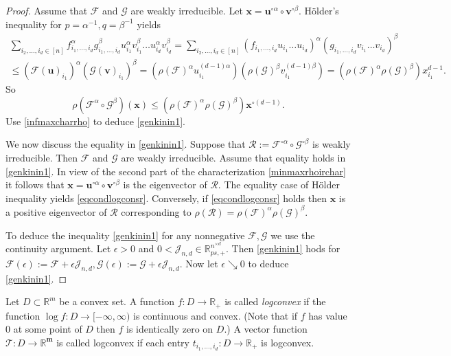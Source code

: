 \documentclass{amsart}
\newcommand{\R}{\mathbb{R}}
\newcommand{\m}{\mathbf{m}}
\newcommand{\uu}{\mathbf{u}}
\newcommand{\bv}{\mathbf{v}}
\newcommand{\x}{\mathbf{x}}
\newcommand{\0}{\mathbf{0}}
\newcommand{\1}{\mathbf{1}}
\newcommand{\cF}{\mathcal{F}}
\newcommand{\cG}{\mathcal{G}}
\newcommand{\cJ}{\mathcal{J}}
\newcommand{\cR}{\mathcal{R}}
\newcommand{\cT}{\mathcal{T}}
\theoremstyle{remark}
\numberwithin{equation}{section} %
\renewcommand{\le}{\leqslant}
\begin{document}
 \begin{proof}
 Assume that  $\cF$ and $\cG$ are weakly irreducible.   Let $\x=\uu^{\circ \alpha}\circ\bv^{\circ\beta}$.
 H\"older's inequality for $p=\alpha^{-1}, q=\beta^{-1}$ yields
 \begin{eqnarray*}
 \sum_{i_2,\ldots,i_d\in[n]} f_{i_1,\ldots,i_d}^{\alpha}g_{i_1,\ldots,i_d}^{\beta}u_{i_1}^{\alpha}v_{i_1}^{\beta}\ldots u_{i_d}^{\alpha}v_{i_d}^{\beta}=
 \sum_{i_2,\ldots,i_d\in[n]} (f_{i_1,\ldots,i_d}u_{i_1}\ldots u_{i_d})^{\alpha}(g_{i_1,\ldots,i_d}v_{i_1}\ldots v_{i_d})^{\beta}\\
 \le (\cF(\uu)_{i_1})^{\alpha}(\cG(\bv)_{i_1})^{\beta}=(\rho(\cF)^{\alpha}u_{i_1}^{(d-1)\alpha})(\rho(\cG)^{\beta}v_{i_1}^{(d-1)\beta})=
 (\rho(\cF)^{\alpha}\rho(\cG)^{\beta})x_{i_1}^{d-1}.
 \end{eqnarray*}
 So
 \[\rho(\cF^{\alpha}\circ\cG^{\beta})(\x)\le (\rho(\cF)^{\alpha}\rho(\cG)^{\beta})\x^{\circ(d-1)}.\]
 Use \eqref{infmaxcharrho} to deduce \eqref{genkinin1}.

 We now discuss the equality in \eqref{genkinin1}.  Suppose that $\cR:=\cF^{\circ \alpha}\circ\cG^{\circ\beta}$ is weakly irreducible.
 Then $\cF$ and $\cG$ are weakly irreducible.  Assume that equality holds in \eqref{genkinin1}.
 In view of the second part of the characterization \eqref{minmaxrhoirchar} it follows that $\x=\uu^{\circ\alpha}\circ\bv^{\circ\beta}$
 is the eigenvector of $\cR$.  
 The equality case of H\"older inequality yields \eqref{eqcondlogconsr}.
%
%
Conversely, if  \eqref{eqcondlogconsr} holds then
$\x$ is a positive eigenvector of $\cR$ corresponding to $\rho(\cR)=\rho(\cF)^{\alpha}\rho(\cG)^{\beta}$.

 To deduce the inequality \eqref{genkinin1} for any nonnegative $\cF,\cG$ we use the continuity argument.  Let $\epsilon>0$ and $0<\cJ_{n,d}\in \R_{ps,+}^{n^{\times d}}$.
 Then \eqref{genkinin1} hods for $\cF(\epsilon):=\cF+\epsilon \cJ_{n,d}, \cG(\epsilon):=\cG+\epsilon\cJ_{n,d}$.  Now let $\epsilon\searrow 0$ to deduce \eqref{genkinin1}.
 \end{proof}

 Let $D\subset \R^m$ be a convex set.  A function $f:D\to \R_+$ is called \emph{logconvex} if the function $\log f:D\to [-\infty,\infty)$
 is continuous and convex.  (Note that if $f$ has value $0$ at some point of $D$ then $f$ is identically zero on $D$.)
 A vector function $\cT:D\to \R^{\m}$ is called logconvex if each entry $t_{i_1,\ldots,i_d}:D\to \R_+$ is logconvex.
\end{document}
